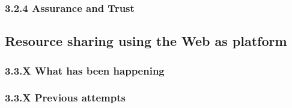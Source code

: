 \documentclass{./llncs2e/llncs}
\begin{document}





\subsubsection{3.2.4 Assurance and Trust}




% 
% 
\subsection{Resource sharing using the Web as platform} 


\subsubsection{3.3.X What has been happening}

\subsubsection{3.3.X Previous attempts}
\end{document}

